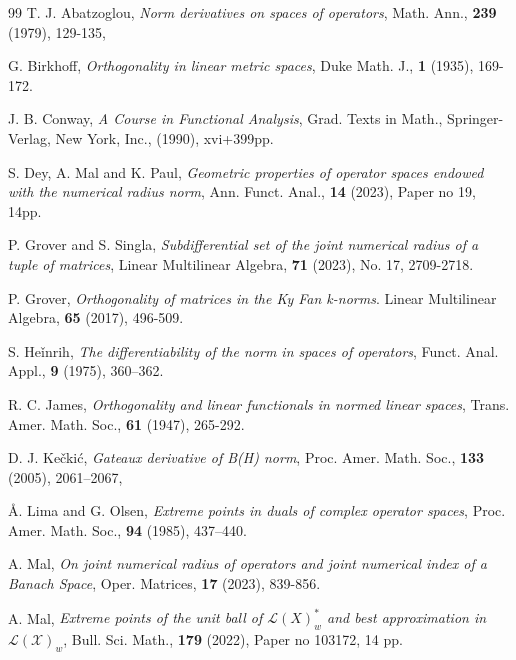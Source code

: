 \documentclass{amsart}
\theoremstyle{definition}
\theoremstyle{remark}
\numberwithin{equation}{section}
\begin{document}

\begin{thebibliography}{99}
	 T. J. Abatzoglou, \textit{Norm derivatives on spaces of operators}, Math. Ann., \textbf{239} (1979), 129-135, %
		
		

 G. Birkhoff,
\textit{Orthogonality in linear metric spaces},
Duke Math. J., \textbf{1} (1935), 169-172.

 J. B. Conway, \textit{A Course in Functional Analysis}, Grad. Texts in Math., Springer-Verlag, New York, Inc., (1990), xvi+399pp.

 S. Dey, A. Mal and K. Paul, \textit{Geometric properties of operator spaces endowed with the numerical radius norm}, Ann. Funct. Anal., \textbf{14} (2023), Paper no 19, 14pp.

 P. Grover and S. Singla, \textit{Subdifferential set of the joint numerical radius of a tuple of matrices}, Linear Multilinear Algebra, \textbf{71}  (2023), No. 17, 2709-2718.

 P. Grover, \textit{Orthogonality of matrices in the Ky Fan k-norms}. Linear Multilinear Algebra, \textbf{65} (2017), 496-509. 

 S. He\v{i}nrih, \textit{The differentiability of the norm in spaces of operators}, Funct. Anal. Appl., \textbf{9} (1975), 360–362.


  R. C. James,  \textit{Orthogonality and linear functionals in normed linear spaces}, Trans. Amer. Math. Soc., \textbf{61} (1947), 265-292.

 D. J. Ke\v{c}ki\'c, \textit{Gateaux derivative of B(H) norm}, Proc. Amer. Math. Soc.,  \textbf{133 } (2005), 2061–2067,
	
 Å. Lima and G. Olsen, \textit{Extreme points in duals of complex operator spaces}, Proc. Amer. Math. Soc., \textbf{94} (1985), 437–440.

 A. Mal, \textit{On joint numerical radius of operators and joint numerical index of a  Banach Space}, Oper. Matrices, \textbf{17} (2023), 839-856.
	
	 A. Mal, \textit{Extreme points of the unit ball of $\mathcal{L}(X)_w^*$ and best approximation in $\mathcal{L}(\mathcal{X})_w$}, Bull. Sci. Math., \textbf{179} (2022), Paper no 103172, 14 pp.
		

\end{thebibliography}
\end{document}
